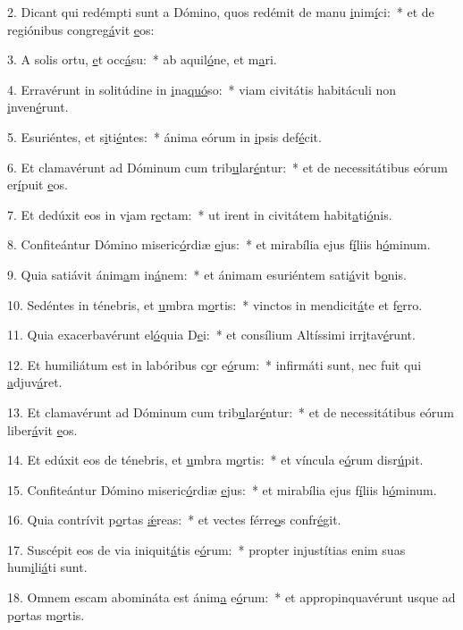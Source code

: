 2. Dicant qui redémpti sunt a Dómino, quos redémit de manu \uline{i}nim\uline{í}ci:~* et de regiónibus congreg\uline{á}vit \uline{e}os:\par 
3. A solis ortu, \uline{e}t occ\uline{á}su:~* ab aquil\uline{ó}ne, et m\uline{a}ri.\par 
4. Erravérunt in solitúdine in \uline{i}na\uline{quó}so:~* viam civitátis habitáculi non \uline{i}nven\uline{é}runt.\par 
5. Esuriéntes, et s\uline{i}ti\uline{é}ntes:~* ánima eórum in \uline{i}psis def\uline{é}cit.\par 
6. Et clamavérunt ad Dóminum cum trib\uline{u}lar\uline{é}ntur:~* et de necessitátibus eórum er\uline{í}puit \uline{e}os.\par 
7. Et dedúxit eos in v\uline{i}am r\uline{e}ctam:~* ut irent in civitátem habit\uline{a}ti\uline{ó}nis.\par 
8. Confiteántur Dómino miseric\uline{ó}rdiæ \uline{e}jus:~* et mirabília ejus f\uline{í}liis h\uline{ó}minum.\par 
9. Quia satiávit ánim\uline{a}m in\uline{á}nem:~* et ánimam esuriéntem sati\uline{á}vit b\uline{o}nis.\par 
10. Sedéntes in ténebris, et \uline{u}mbra m\uline{o}rtis:~* vinctos in mendicit\uline{á}te et f\uline{e}rro.\par 
11. Quia exacerbavérunt el\uline{ó}quia D\uline{e}i:~* et consílium Altíssimi irr\uline{i}tav\uline{é}runt.\par 
12. Et humiliátum est in labóribus c\uline{o}r e\uline{ó}rum:~* infirmáti sunt, nec fuit qui \uline{a}djuv\uline{á}ret.\par 
13. Et clamavérunt ad Dóminum cum trib\uline{u}lar\uline{é}ntur:~* et de necessitátibus eórum liber\uline{á}vit \uline{e}os.\par 
14. Et edúxit eos de ténebris, et \uline{u}mbra m\uline{o}rtis:~* et víncula e\uline{ó}rum disr\uline{ú}pit.\par 
15. Confiteántur Dómino miseric\uline{ó}rdiæ \uline{e}jus:~* et mirabília ejus f\uline{í}liis h\uline{ó}minum.\par 
16. Quia contrívit p\uline{o}rtas \uline{ǽ}reas:~* et vectes férre\uline{o}s confr\uline{é}git.\par 
17. Suscépit eos de via iniquit\uline{á}tis e\uline{ó}rum:~* propter injustítias enim suas hum\uline{i}li\uline{á}ti sunt.\par 
18. Omnem escam abomináta est ánim\uline{a} e\uline{ó}rum:~* et appropinquavérunt usque ad p\uline{o}rtas m\uline{o}rtis.\par 
